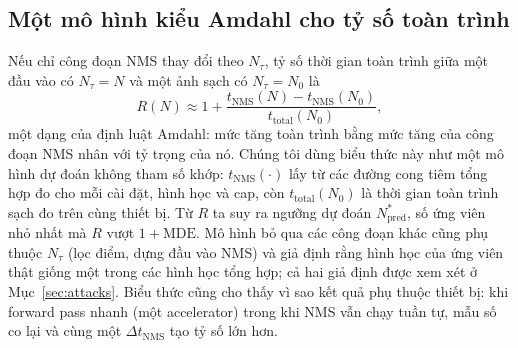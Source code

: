 \documentclass[a4paper,fleqn]{cas-dc}
\newcommand{\Ntau}{N_{\tau}}
\begin{document}
\subsection{Một mô hình kiểu Amdahl cho tỷ số toàn trình}
\label{sec:amdahl}
Nếu chỉ công đoạn NMS thay đổi theo $\Ntau$, tỷ số thời gian toàn trình giữa một đầu vào có $\Ntau = N$ và một ảnh sạch có $\Ntau = N_0$ là
\begin{equation}
R(N) \approx 1 + \frac{t_{\mathrm{NMS}}(N) - t_{\mathrm{NMS}}(N_0)}{t_{\mathrm{total}}(N_0)} ,
\end{equation}
một dạng của định luật Amdahl: mức tăng toàn trình bằng mức tăng của công đoạn NMS nhân với tỷ trọng của nó. Chúng tôi dùng biểu thức này như một mô hình dự đoán không tham số khớp: $t_{\mathrm{NMS}}(\cdot)$ lấy từ các đường cong tiêm tổng hợp đo cho mỗi cài đặt, hình học và cap, còn $t_{\mathrm{total}}(N_0)$ là thời gian toàn trình sạch đo trên cùng thiết bị. Từ $R$ ta suy ra ngưỡng dự đoán $N^{*}_{\mathrm{pred}}$, số ứng viên nhỏ nhất mà $R$ vượt $1+\mathrm{MDE}$. Mô hình bỏ qua các công đoạn khác cũng phụ thuộc $\Ntau$ (lọc điểm, dựng đầu vào NMS) và giả định rằng hình học của ứng viên thật giống một trong các hình học tổng hợp; cả hai giả định được xem xét ở Mục~\ref{sec:attacks}. Biểu thức cũng cho thấy vì sao kết quả phụ thuộc thiết bị: khi forward pass nhanh (một accelerator) trong khi NMS vẫn chạy tuần tự, mẫu số co lại và cùng một $\Delta t_{\mathrm{NMS}}$ tạo tỷ số lớn hơn.
\end{document}
